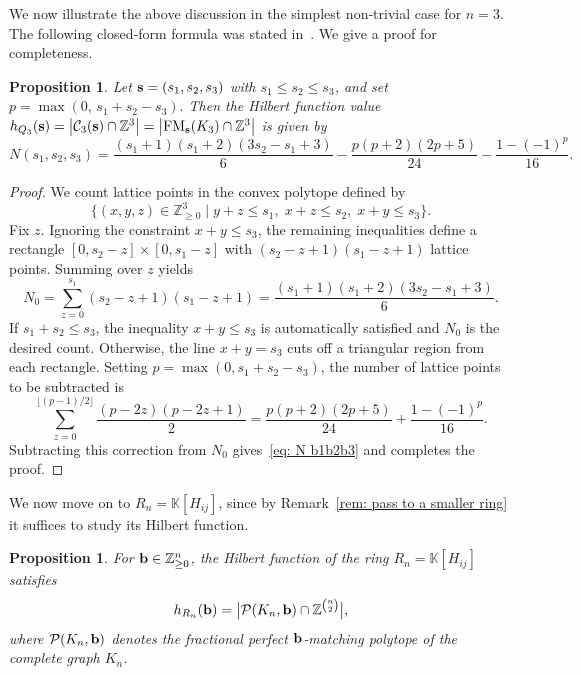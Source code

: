 \documentclass[12pt,a4paper]{extarticle}
\newtheorem{proposition}[theorem]{Proposition}
\theoremstyle{definition}
\newcommand{\K}{\mathbb{K}}
\begin{document}
\medskip

We now illustrate the above discussion in the simplest non‑trivial case for $n=3$.
The following closed‑form formula was stated in~\cite[eq.~4.20]{CPPR}. We give a proof for completeness.
\begin{proposition}\label{prop: Ns1s2s3}
Let ${\bf s}=(s_1,s_2,s_3)$ with $s_1\le s_2\le s_3$, and set
$
p=\max(0,\,s_1+s_2-s_3).
$
Then the Hilbert function value
$
h_{Q_3}({\bf s})
= \bigl|{\cal C}_3({\bf s})\cap\mathbb{Z}^3\bigr| = 
\bigl|{\rm FM}_{\bf s}(K_3)\cap\mathbb{Z}^3\bigr|
$
is given by
\begin{equation}\label{eq: N b1b2b3}
N(s_1,s_2,s_3)
=
\frac{(s_1+1)(s_1+2)(3s_2-s_1+3)}{6}
-
\frac{p(p+2)(2p+5)}{24}
-
\frac{1-(-1)^p}{16}.
\end{equation}
\end{proposition}
\begin{proof}
We count lattice points in the convex polytope defined by
$$
\bigl\{(x,y,z)\in\mathbb{Z}_{\ge0}^3
\mid y+z\le s_1,\; x+z\le s_2,\; x+y\le s_3\bigr\}.
$$
Fix $z$. Ignoring the constraint $x+y\le s_3$, the remaining inequalities define a rectangle
$[0,s_2-z]\times[0,s_1-z]$ with $(s_2-z+1)(s_1-z+1)$ lattice points.
Summing over $z$ yields
$$
N_0=\sum_{z=0}^{s_1}(s_2-z+1)(s_1-z+1)
=\frac{(s_1+1)(s_1+2)(3s_2-s_1+3)}{6}.
$$
If $s_1+s_2\le s_3$, the inequality $x+y\le s_3$ is automatically satisfied and $N_0$ is the
desired count. Otherwise, the line $x+y=s_3$ cuts off a triangular region from each rectangle.
Setting $p=\max(0,s_1+s_2-s_3)$, the number of lattice points to be subtracted is
$$
\sum_{z=0}^{\lfloor (p-1)/2\rfloor}\frac{(p-2z)(p-2z+1)}{2}
=
\frac{p(p+2)(2p+5)}{24}
+
\frac{1-(-1)^p}{16}.
$$
Subtracting this correction from $N_0$ gives~\eqref{eq: N b1b2b3} and completes the proof.
\end{proof}
\noindent
We now move on to $R_n=\K[H_{ij}]$, since by Remark~\ref{rem: pass to a smaller ring} it suffices to study its Hilbert function.

\begin{proposition}\label{prop: HF perfect matching}
For ${\bf b} \in\mathbb{Z}_{\ge0}^n$, the Hilbert function of the ring
$
R_n=\K[H_{ij}]
$
satisfies
$$
h_{R_n}({\bf b})
=
\bigl|\mathcal{P}(K_n,{\bf b})\cap\mathbb{Z}^{\binom{n}{2}}\bigr|,
$$
where $\mathcal{P}(K_n,{\bf b})$ denotes the fractional perfect ${\bf b}$‑matching polytope of the
complete graph $K_n$.
\end{proposition}
\end{document}
